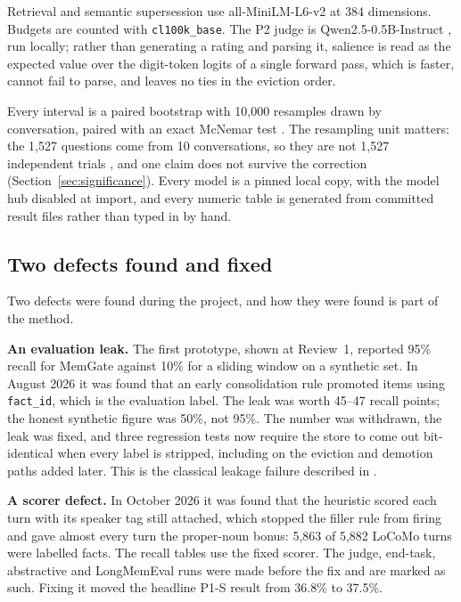 Retrieval and semantic supersession use all-MiniLM-L6-v2 at 384 dimensions.
Budgets are counted with \texttt{cl100k\_base}. The P2 judge is
Qwen2.5-0.5B-Instruct \cite{qwen2025}, run locally; rather than generating a
rating and parsing it, salience is read as the expected value over the
digit-token logits of a single forward pass, which is faster, cannot fail to
parse, and leaves no ties in the eviction order.

Every interval is a paired bootstrap \cite{efron1993bootstrap} with
10{,}000 resamples drawn by conversation, paired with an exact McNemar test
\cite{mcnemar1947,dietterich1998tests}. The resampling unit matters: the
1{,}527 questions come from 10 conversations, so they are not 1{,}527
independent trials \cite{cameron2008cluster}, and one claim does not survive
the correction (Section~\ref{sec:significance}). Every model is a pinned local
copy, with the model hub disabled at import, and every numeric table is
generated from committed result files rather than typed in by hand.

\subsection{Two defects found and fixed}
\label{sec:leak}
\label{sec:prefix}
Two defects were found during the project, and how they were found is part of
the method.

\textbf{An evaluation leak.} The first prototype, shown at Review~1, reported
95\% recall for MemGate against 10\% for a sliding window on a synthetic set.
In August 2026 it was found that an early consolidation rule promoted items
using \texttt{fact\_id}, which is the evaluation label. The leak was worth
45--47 recall points; the honest synthetic figure was 50\%, not 95\%. The
number was withdrawn, the leak was fixed, and three regression tests now
require the store to come out bit-identical when every label is stripped,
including on the eviction and demotion paths added later. This is the
classical leakage failure described in \cite{kaufman2012leakage,kapoor2023leakage}.

\textbf{A scorer defect.} In October 2026 it was found that the heuristic
scored each turn with its speaker tag still attached, which stopped the filler
rule from firing and gave almost every turn the proper-noun bonus: 5{,}863 of
5{,}882 LoCoMo turns were labelled facts. The recall tables use the fixed
scorer. The judge, end-task, abstractive and LongMemEval runs were made before
the fix and are marked as such. Fixing it moved the headline P1-S result from
36.8\% to 37.5\%.

